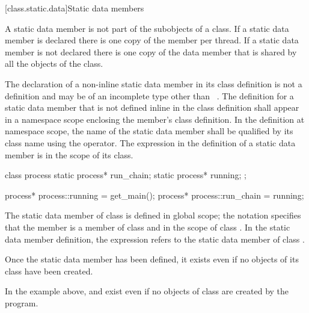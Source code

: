 [class.static.data]{Static data members}
%

\pnum
A static data member is not part of the subobjects of a class. If a
static data member is declared  there is one copy of
the member per thread. If a static data member is not declared
 there is one copy of the data member that is shared by all
the objects of the class.

\pnum
{}%
%
The declaration of a non-inline
static data member in its class definition
is not a definition and may be of an incomplete type other than
\cv{}~. The definition for a static data
member that is not defined inline in the class definition
shall appear in a namespace scope enclosing the member's class
definition.
%
In the definition at namespace scope, the name of the static
data member shall be qualified by its class name using the \tcode{::}
operator. The  expression in the definition of a
static data member is in the scope of its
class.
\begin{example}

\begin{codeblock}
class process {
  static process* run_chain;
  static process* running;
};

process* process::running = get_main();
process* process::run_chain = running;
\end{codeblock}

The static data member  of class
 is defined in global scope; the notation
 specifies that the member 
is a member of class  and in the scope of class
. In the static data member definition, the
 expression refers to the static data
member  of class .
\end{example}

\begin{note}
Once the static data member has been defined, it exists even if
no objects of its class have been created.
\begin{example}
In the example above,  and  exist even
if no objects of class  are created by the program.
\end{example}
\end{note}

